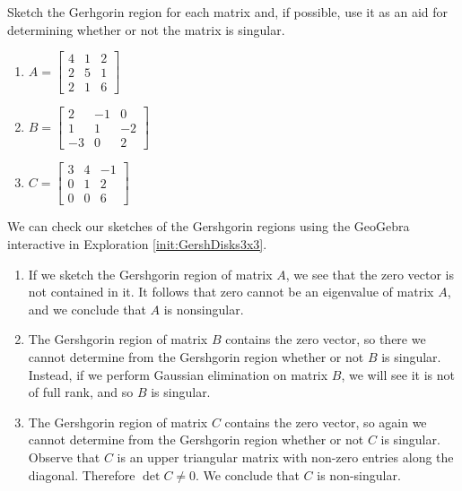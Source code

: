 \documentclass{ximera}
\begin{document}
\begin{example}\label{ex:does_Gersh_contain_zero}
    Sketch the Gerhgorin region for each matrix and, if possible, use it as an aid for determining whether or not the matrix is singular.
\begin{enumerate}
    \item $A=\begin{bmatrix}  4&1&2\\2&5&1\\2&1&6
 \end{bmatrix}$
    \item $B=\begin{bmatrix}  2&-1&0\\1&1&-2\\-3&0&2
 \end{bmatrix}$
 \item $C=\begin{bmatrix}3 & 4 & -1\\0&1&2\\0&0&6\end{bmatrix}$
 \end{enumerate}

\begin{explanation}
    We can check our sketches of the Gershgorin regions using the GeoGebra interactive in Exploration \ref{init:GershDisks3x3}.
    
\begin{enumerate}
    \item If we sketch the Gershgorin region of matrix $A$, we see that the zero vector is not contained in it.  It follows that zero cannot be an eigenvalue of matrix $A$, and we conclude that $A$ is nonsingular.

    \item The Gershgorin region of matrix $B$ contains the zero vector, so there we cannot determine from the Gershgorin region whether or not $B$ is singular.  Instead, if we perform Gaussian elimination on matrix $B$, we will see it is not of full rank, and so $B$ is singular.

    \item The Gershgorin region of matrix $C$ contains the zero vector, so again we cannot determine from the Gershgorin region whether or not $C$ is singular. Observe that $C$ is an upper triangular matrix with non-zero entries along the diagonal.  Therefore $\det{C}\neq 0$.  We conclude that $C$ is non-singular.
\end{enumerate}
\end{explanation}
\end{example}
\end{document}
